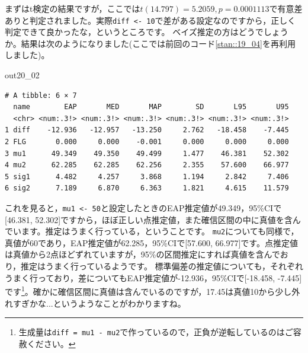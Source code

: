 \documentclass{ltjsbook}
\begin{document}
まずはt検定の結果ですが，ここでは$t(14.797)=5.2059,p=0.0001113$で有意差ありと判定されました。実際\verb|diff <- 10|で差がある設定なのですから，正しく判定できて良かったな，というところです。
ベイズ推定の方はどうでしょうか。結果は次のようになりました(ここでは前回のコード\ref{stan::19_04}を再利用しました)。
\begin{MCMCout}{}{out20_02}
	\begin{verbatim}
# A tibble: 6 × 7
  name        EAP       MED       MAP        SD       L95       U95
  <chr> <num:.3!> <num:.3!> <num:.3!> <num:.3!> <num:.3!> <num:.3!>
1 diff    -12.936   -12.957   -13.250     2.762   -18.458    -7.445
2 FLG       0.000     0.000    -0.001     0.000     0.000     0.000
3 mu1      49.349    49.350    49.499     1.477    46.381    52.302
4 mu2      62.285    62.285    62.256     2.355    57.600    66.977
5 sig1      4.482     4.257     3.868     1.194     2.842     7.406
6 sig2      7.189     6.870     6.363     1.821     4.615    11.579
\end{verbatim}
\end{MCMCout}
これを見ると，\verb|mu1 <- 50|と設定したときのEAP推定値が49.349，95\%CIで[46.381, 52.302]ですから，ほぼ正しい点推定値，また確信区間の中に真値を含んでいます。推定はうまく行っている，ということです。
\verb|mu2|についても同様で，真値が60であり，EAP推定値が62.285，95\%CIで[57.600, 66.977]です。点推定値は真値から2点ほどずれていますが，95\%の区間推定にすれば真値を含んでおり，推定はうまく行っているようです。
標準偏差の推定値についても，それぞれうまく行っており，差についてもEAP推定値が-12.936，95\%CIで[-18.458, -7.445]です\footnote{生成量は\verb|diff = mu1 - mu2|で作っているので，正負が逆転しているのはご容赦ください。}。確かに確信区間に真値は含んでいるのですが，17.45は真値10から少し外れすぎかな...というようなことがわかりますね。
\end{document}
